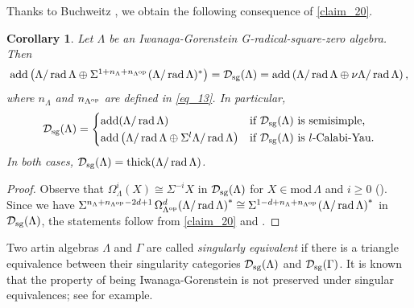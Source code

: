 \documentclass[12pt]{amsart}
\numberwithin{equation}{subsection}
\theoremstyle{plain}
\newtheorem{corollary}[theorem]{Corollary}
\theoremstyle{definition}
\newcommand{\rad}{\operatorname{rad}}
\newcommand{\add}{\operatorname{add}}
\renewcommand{\mod}{\mathrm{mod}\,}
\newcommand{\thick}{\operatorname{thick}}
\renewcommand{\L}{\Lambda}
\newcommand{\D}{\mathcal{D}}
\newcommand{\op}{{\rm op}}
\begin{document}
Thanks to Buchweitz \cite{Buchweitz_1986}, we obtain the following consequence of \cref{claim_20}.



\begin{corollary}\label{claim_41}
Let $\L$ be an Iwanaga-Gorenstein  G-radical-square-zero algebra.
Then 
\begin{align}
    \textstyle 
    \add\left(\L/\rad\L \oplus \Sigma^{1+n_{\L}+n_{\L^\op}}(\L/\rad\L)^*\right)=\D_{\rm sg}(\L)
    = \add\left(\L/\rad\L \oplus \nu\L/\rad\L\right),
\end{align}
where $n_{\L}$ and $n_{\L^\op}$ are defined in \eqref{eq_13}.
In particular,
\begin{align}
    \textstyle 
    \D_{\rm sg}(\L)=     
    \begin{cases}
    \add(\L/\rad\L) & \text{if $\D_{\rm sg}(\L)$ is semisimple,} \\[1pt]
    \add\left(\L/\rad\L \oplus \Sigma^l\L/\rad\L\right) & \text{if $\D_{\rm sg}(\L)$ is $l$-Calabi-Yau.}
    \end{cases}
\end{align}
In both cases,  $\D_{\rm sg}(\L) = \thick(\L/\rad\L)$.
\end{corollary} 
\begin{proof}
Observe that $\Omega_\L^i(X) \cong \Sigma^{-i}X$ in $\D_{\rm sg}(\L)$ for $X\in\mod\L$ and $i\geq 0$ (\cite[Lemma 2.2.1]{Buchweitz_1986}).
Since we have  $\Sigma^{n_\L+n_{\L^\op}-2d+1}\hspace{1.5pt}\Omega_{\L^\op}^{d}\!\left(\L/\rad\L\right)^*  \cong \Sigma^{1-d+n_\L+n_{\L^\op}}\!\left(\L/\rad\L\right)^* $ in $\D_{\rm sg}(\L)$, the statements follow from \cref{claim_20} and \cite[Theorem 4.4.1]{Buchweitz_1986}.
\end{proof}






Two artin algebras $\L$ and $\Gamma$ are called {\it singularly equivalent} if there is a triangle equivalence between their singularity categories $\D_{\rm sg}(\L)$ and $\D_{\rm sg}(\Gamma)$.
It is known that the property of being Iwanaga-Gorenstein is not preserved under singular equivalences; see \cite[Example 4.3]{X-WChen_2009} for example.
\end{document}
